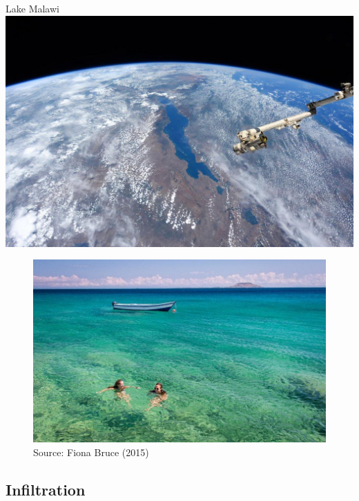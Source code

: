 \documentclass[
  letterpaper,
  DIV=11,
  numbers=noendperiod]{scrreprt}
\begin{document}
Lake Malawi \includegraphics{archive/figures/lake-malawi.jpg}

\begin{figure}

{\centering \includegraphics{archive/figures/lake-malawi2.jpg}

}

\caption{Source: Fiona Bruce (2015)}

\end{figure}

\hypertarget{infiltration}{%
\subsection{Infiltration}\label{infiltration}}
\end{document}
